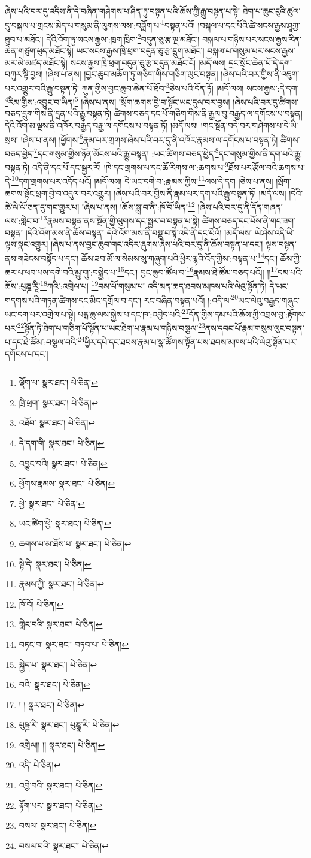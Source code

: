 ཞེས་པའི་བར་དུ་འདིས་ནི་དེ་བཞིན་གཤེགས་པ་ཤིན་ཏུ་བསྟན་པའི་ཆོས་ཀྱི་རྒྱུ་བསྟན་པ་སྟེ། ཐེག་པ་ཆུང་ངུའི་ཚུལ་དུ་བསྐལ་པ་གྲངས་མེད་པ་གསུམ་ནི་ལུགས་ལས་:བཟློག་པ་\footnote{ལྡོག་པ་  སྣར་ཐང་།  པེ་ཅིན། }བསྟན་པའོ། །བསྐལ་པ་དང་པོའི་ཚེ་སངས་རྒྱས་ཤཱཀྱ་ཐུབ་པ་མཐོང་། དེའི་འོག་ཏུ་སངས་རྒྱས་:ཁྲག་ཁྲིག་\footnote{ཁྲི་ཕྲག་  སྣར་ཐང་།  པེ་ཅིན། }བདུན་ཅུ་རྩ་ལྔ་མཐོང་། བསྐལ་པ་གཉིས་པར་སངས་རྒྱས་རིན་ཆེན་གཙུག་ཕུད་མཐོང་སྟེ། ཡང་སངས་རྒྱས་ཁྲི་ཕྲག་བདུན་ཅུ་རྩ་དྲུག་མཐོང་། བསྐལ་པ་གསུམ་པར་སངས་རྒྱས་མར་མེ་མཛད་མཐོང་སྟེ། སངས་རྒྱས་ཁྲི་ཕྲག་བདུན་ཅུ་རྩ་བདུན་མཐོང་ངོ། །མདོ་ལས། དྲང་སྲོང་ཆེན་པོ་དེ་དག་བཀུར་སྟི་བྱས། །ཞེས་པ་ནས། །བྱང་ཆུབ་མཆོག་ཏུ་གཅིག་གིས་གཅིག་ལུང་བསྟན། །ཞེས་པའི་བར་གྱིས་ནི་འཇུག་པར་འགྱུར་བའི་རྒྱུ་བསྟན་ཏེ། ཀུན་གྱིས་བྱང་ཆུབ་ཆེན་པོ་ཐོབ་\footnote{འཐོབ་  སྣར་ཐང་།  པེ་ཅིན། }ཅེས་པའི་དོན་ཏོ། །མདོ་ལས། སངས་རྒྱས་:དེ་དག་\footnote{དེ་དག་གི་  སྣར་ཐང་།  པེ་ཅིན། }རིམ་གྱིས་:འབྱུང་བ་ཡིན།\footnote{འབྱུང་བའི།  སྣར་ཐང་།  པེ་ཅིན། } །ཞེས་པ་ནས། །སྲོག་ཆགས་བྱེ་བ་སྟོང་ཡང་དུལ་བར་བྱས། །ཞེས་པའི་བར་དུ་ཚིགས་བཅད་དྲུག་གིས་ནི་དྲན་པའི་རྒྱུ་བསྟན་ཏེ། ཚིགས་བཅད་དང་པོ་གཅིག་གིས་ནི་རྒྱལ་བུ་བརྒྱད་ལ་དགོངས་པ་བསྟན། དེའི་འོག་མ་ལྔས་ནི་འཁོར་བརྒྱད་བརྒྱ་ལ་དགོངས་པ་བསྟན་ཏོ། །མདོ་ལས། །གང་སྔོན་བདེ་བར་གཤེགས་པ་དེ་ཡི་སྲས། །ཞེས་པ་ནས། །ཕྱོགས་\footnote{ཕྱོགས་རྣམས་  སྣར་ཐང་།  པེ་ཅིན། }རྣམ་པར་གྲགས་ཞེས་པའི་བར་དུ་ནི་འཁོར་རྣམས་ལ་དགོངས་པ་བསྟན་ཏེ། ཚིགས་བཅད་ཕྱེད་\footnote{ཕྱེ་  སྣར་ཐང་།  པེ་ཅིན། }དང་གསུམ་གྱིས་ཉོན་མོངས་པའི་རྒྱུ་བསྟན། :ཡང་ཚིགས་བཅད་ཕྱེད་\footnote{ཡང་ཚིག་ཕྱེ་  སྣར་ཐང་།  པེ་ཅིན། }དང་གསུམ་གྱིས་ནི་དག་པའི་རྒྱུ་བསྟན་ཏེ། འདི་ནི་དང་པོ་དང་སྦྱར་རོ། །ཁེ་དང་གྲགས་པ་དང་ཆོ་རིགས་ལ་:ཆགས་པ་\footnote{ཆགས་པ་མ་ཐོས་པ་  སྣར་ཐང་།  པེ་ཅིན། }ཐོས་པར་རྩོལ་བའི་ཆགས་པ་དེ་\footnote{སྟེ་དེ་  སྣར་ཐང་།  པེ་ཅིན། }དག་གྲགས་པར་འདོད་པའོ། །མདོ་ལས། དེ་ཡང་དགེ་བ་:རྣམས་ཀྱིས་\footnote{རྣམས་ཀྱི་  སྣར་ཐང་།  པེ་ཅིན། }ལས་དེ་དག །ཅེས་པ་ནས། །སྲོག་ཆགས་སྟོང་ཕྲག་བྱེ་བ་འདུལ་བར་འགྱུར། །ཞེས་པའི་བར་གྱིས་ནི་རྣམ་པར་དག་པའི་རྒྱུ་བསྟན་ཏོ། །མདོ་ལས། །དེའི་ཚེ་ལེ་ལོ་ཅན་དུ་གང་གྱུར་པ། །ཞེས་པ་ནས། །ཆོས་སྨྲ་བ་ནི་:ཁོ་བོ་ཡིན།\footnote{ཁོ་བོ།  པེ་ཅིན། } །ཞེས་པའི་བར་དུ་ནི་དོན་གཞན་ལས་:གླེང་བ་\footnote{གླེང་བའི་  སྣར་ཐང་།  པེ་ཅིན། }རྣམས་བསྟན་ནས་སྔོན་གྱི་ལུགས་དང་སྦྱར་བ་བསྟན་པ་སྟེ། ཚིགས་བཅད་དང་པོས་ནི་གང་ཟག་བསྟན། །དེའི་འོག་མས་ནི་ཆོས་བསྟན། དེའི་འོག་མས་ནི་བསྡུ་བ་སྟེ་འདི་ནི་དང་པོའོ། །མདོ་ལས། ཡེ་ཤེས་འདི་ཡི་ལྟས་སྣང་འགྱུར། །ཞེས་པ་ནས་བྱང་ཆུབ་གང་འདིར་ཞུགས་ཞེས་པའི་བར་དུ་ནི་ཆོས་བསྟན་པ་དང་། ལྟས་བསྟན་ནས་གཟེངས་བསྟོད་པ་དང་། ཆོས་ཟབ་མོ་ལ་སེམས་སུ་གཞུག་པའི་ཕྱིར་ལྷའི་འོད་ཀྱིས་:བསྟན་པ་\footnote{བཏང་བ་  སྣར་ཐང་། བཏབ་པ་  པེ་ཅིན། }དང་། ཆོས་ཀྱི་ཆར་པ་ཕབ་པས་དགེ་བའི་མྱུ་གུ་:བསྐྱེད་པ་\footnote{སྐྱེད་པ་  སྣར་ཐང་།  པེ་ཅིན། }དང་། བྱང་ཆུབ་ཚོལ་བ་\footnote{བའི་  སྣར་ཐང་།  པེ་ཅིན། }རྣམས་ཐེ་ཚོམ་བཅད་པའོ།། །།\footnote{། །  སྣར་ཐང་།  པེ་ཅིན། }དམ་པའི་ཆོས་:པུཎྜ་རཱི་\footnote{པུཥྜ་རི་  སྣར་ཐང་། པུཎྜཱ་རི་  པེ་ཅིན། }ཀའི་:འགྲེལ་པ། \footnote{འགྲེལ།། །།   སྣར་ཐང་།  པེ་ཅིན། }བམ་པོ་གསུམ་པ། འདི་མན་ཆད་ཐབས་མཁས་པའི་ལེའུ་སྟོན་ཏེ། དེ་ཡང་གདགས་པའི་གཏན་ཚིགས་དང་མིང་དགྲོལ་བ་དང་། རང་བཞིན་བསྟན་པའོ། །:འདི་ལ་\footnote{འདི་  པེ་ཅིན། }ཡང་ལེའུ་བརྒྱད་གཞུང་ཡང་དག་པར་འགྲེལ་པ་སྟེ། པདྨ་ཆུ་ལས་སྐྱེས་པ་དང་ཁ་:འབྱེད་པའི་\footnote{འབྱེ་བའི་  སྣར་ཐང་།  པེ་ཅིན། }དོན་གྱིས་དམ་པའི་ཆོས་ཀྱི་འབྲས་བུ་:རྟོགས་པར་\footnote{རྟོག་པར་  སྣར་ཐང་།  པེ་ཅིན། }སྟོན་ཏེ་ཐེག་པ་གཅིག་པོ་སྟོན་པ་ཡང་ཐེག་པ་རྣམ་པ་གཉིས་བསྩལ་\footnote{བསལ་  སྣར་ཐང་།  པེ་ཅིན། }ནས་དབང་པོ་རྣམ་གསུམ་ལུང་བསྟན་པ་དང་ཐེ་ཚོམ་:བསྩལ་བའི་\footnote{བསལ་བའི་  སྣར་ཐང་།  པེ་ཅིན། }ཕྱིར་དཔེ་དང་ཐབས་རྣམ་པ་སྣ་ཚོགས་སྟོན་པས་ཐབས་མཁས་པའི་ལེའུ་སྟོན་པར་དགོངས་པ་དང་། 